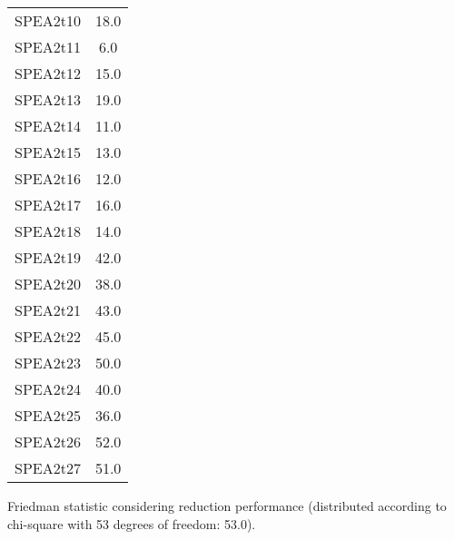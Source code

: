 \documentclass{article}
\begin{document}
\begin{table}[!htp]
\begin{tabular}{c|c}
SPEA2t10&18.0\\
SPEA2t11&6.0\\
SPEA2t12&15.0\\
SPEA2t13&19.0\\
SPEA2t14&11.0\\
SPEA2t15&13.0\\
SPEA2t16&12.0\\
SPEA2t17&16.0\\
SPEA2t18&14.0\\
SPEA2t19&42.0\\
SPEA2t20&38.0\\
SPEA2t21&43.0\\
SPEA2t22&45.0\\
SPEA2t23&50.0\\
SPEA2t24&40.0\\
SPEA2t25&36.0\\
SPEA2t26&52.0\\
SPEA2t27&51.0\\
\end{tabular}
\end{table}


Friedman statistic considering reduction performance (distributed according to chi-square with 53 degrees of freedom: 53.0).
\end{document}
